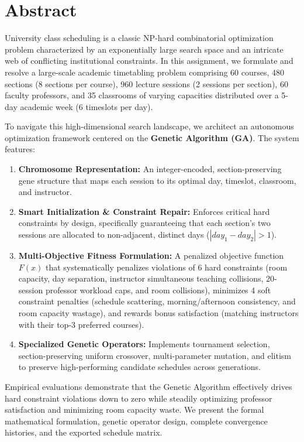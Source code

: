 \documentclass[12pt,a4paper]{report}
\begin{document}
\newpage

\chapter*{Abstract}

University class scheduling is a classic NP-hard combinatorial optimization problem characterized by an exponentially large search space and an intricate web of conflicting institutional constraints. In this assignment, we formulate and resolve a large-scale academic timetabling problem comprising 60 courses, 480 sections (8 sections per course), 960 lecture sessions (2 sessions per section), 60 faculty professors, and 35 classrooms of varying capacities distributed over a 5-day academic week (6 timeslots per day). 

To navigate this high-dimensional search landscape, we architect an autonomous optimization framework centered on the \textbf{Genetic Algorithm (GA)}. The system features:
\begin{enumerate}[leftmargin=1.5em]
  \item \textbf{Chromosome Representation:} An integer-encoded, section-preserving gene structure that maps each session to its optimal day, timeslot, classroom, and instructor.
  \item \textbf{Smart Initialization \& Constraint Repair:} Enforces critical hard constraints by design, specifically guaranteeing that each section's two sessions are allocated to non-adjacent, distinct days ($|day_1 - day_2| > 1$).
  \item \textbf{Multi-Objective Fitness Formulation:} A penalized objective function $F(x)$ that systematically penalizes violations of 6 hard constraints (room capacity, day separation, instructor simultaneous teaching collisions, 20-session professor workload caps, and room collisions), minimizes 4 soft constraint penalties (schedule scattering, morning/afternoon consistency, and room capacity wastage), and rewards bonus satisfaction (matching instructors with their top-3 preferred courses).
  \item \textbf{Specialized Genetic Operators:} Implements tournament selection, section-preserving uniform crossover, multi-parameter mutation, and elitism to preserve high-performing candidate schedules across generations.
\end{enumerate}

Empirical evaluations demonstrate that the Genetic Algorithm effectively drives hard constraint violations down to zero while steadily optimizing professor satisfaction and minimizing room capacity waste. We present the formal mathematical formulation, genetic operator design, complete convergence histories, and the exported schedule matrix.
\end{document}
